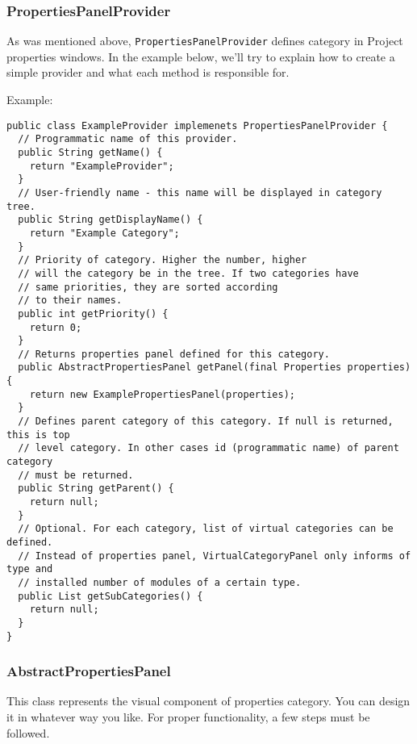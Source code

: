 \documentclass[a4paper,10pt,oneside]{article}
\begin{document}
\subsubsection*{PropertiesPanelProvider}
\par 
  As was mentioned above, \texttt{PropertiesPanelProvider} defines
  category in Project properties windows. In the example below, we'll try to
  explain how to create a simple provider and what each method is responsible for.

\noindent Example:	
\begin{verbatim}
public class ExampleProvider implemenets PropertiesPanelProvider {
  // Programmatic name of this provider.
  public String getName() {
    return "ExampleProvider";
  }
  // User-friendly name - this name will be displayed in category tree.
  public String getDisplayName() {
    return "Example Category";
  }
  // Priority of category. Higher the number, higher
  // will the category be in the tree. If two categories have
  // same priorities, they are sorted according
  // to their names.
  public int getPriority() {
    return 0;
  }
  // Returns properties panel defined for this category.
  public AbstractPropertiesPanel getPanel(final Properties properties) {
    return new ExamplePropertiesPanel(properties);
  }
  // Defines parent category of this category. If null is returned, this is top
  // level category. In other cases id (programmatic name) of parent category
  // must be returned.
  public String getParent() {
    return null;
  }
  // Optional. For each category, list of virtual categories can be defined.
  // Instead of properties panel, VirtualCategoryPanel only informs of type and
  // installed number of modules of a certain type.
  public List getSubCategories() {
    return null;
  }
}
\end{verbatim}

\subsubsection*{AbstractPropertiesPanel}
\par 
  This class represents the visual component of properties category. You can
  design it in whatever way you like. For proper functionality, a few steps must
  be followed.
\end{document}

